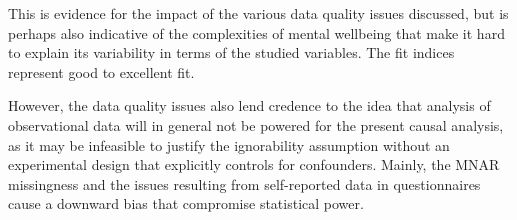This is evidence for the impact of the various data quality issues discussed, but is perhaps also indicative of the
complexities of mental wellbeing that make it hard to explain its variability in terms of the studied variables.
The fit indices represent good to excellent fit.

However, the data quality issues also lend credence to the idea that analysis of observational data will in general
not be powered for the present causal analysis, as it may be infeasible to justify the ignorability assumption
without an experimental design that explicitly controls for confounders. Mainly, the MNAR missingness and the issues resulting
from self-reported data in questionnaires cause a downward bias that compromise statistical power.

